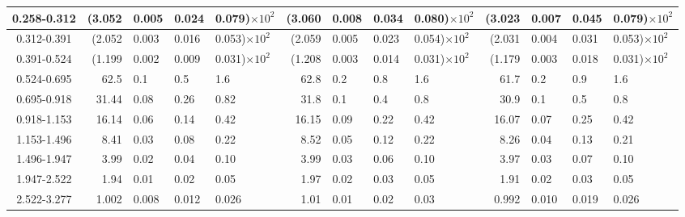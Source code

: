 \begin{table}[!htbp]
{\begin{tabular}{ | c | r@{$\pm$}l@{$\pm$}l@{$\pm$}l | r@{$\pm$}l@{$\pm$}l@{$\pm$}l | r@{$\pm$}l@{$\pm$}l@{$\pm$}l |}
0.258-0.312 & (3.052&0.005&0.024&0.079)$\times 10^{2}$ & (3.060&0.008&0.034&0.080)$\times 10^{2}$ & (3.023&0.007&0.045&0.079)$\times 10^{2}$ \\ \hline
0.312-0.391 & (2.052&0.003&0.016&0.053)$\times 10^{2}$ & (2.059&0.005&0.023&0.054)$\times 10^{2}$ & (2.031&0.004&0.031&0.053)$\times 10^{2}$ \\ \hline
0.391-0.524 & (1.199&0.002&0.009&0.031)$\times 10^{2}$ & (1.208&0.003&0.014&0.031)$\times 10^{2}$ & (1.179&0.003&0.018&0.031)$\times 10^{2}$ \\ \hline
0.524-0.695 & 62.5&0.1&0.5&1.6 & 62.8&0.2&0.8&1.6 & 61.7&0.2&0.9&1.6 \\ \hline
0.695-0.918 & 31.44&0.08&0.26&0.82 & 31.8&0.1&0.4&0.8 & 30.9&0.1&0.5&0.8 \\ \hline
0.918-1.153 & 16.14&0.06&0.14&0.42 & 16.15&0.09&0.22&0.42 & 16.07&0.07&0.25&0.42 \\ \hline
1.153-1.496 & 8.41&0.03&0.08&0.22 & 8.52&0.05&0.12&0.22 & 8.26&0.04&0.13&0.21 \\ \hline
1.496-1.947 & 3.99&0.02&0.04&0.10 & 3.99&0.03&0.06&0.10 & 3.97&0.03&0.07&0.10 \\ \hline
1.947-2.522 & 1.94&0.01&0.02&0.05 & 1.97&0.02&0.03&0.05 & 1.91&0.02&0.03&0.05 \\ \hline
2.522-3.277 & 1.002&0.008&0.012&0.026 & 1.01&0.01&0.02&0.03 & 0.992&0.010&0.019&0.026 \\ \hline
\end{tabular}}
\end{table}
\clearpage 
